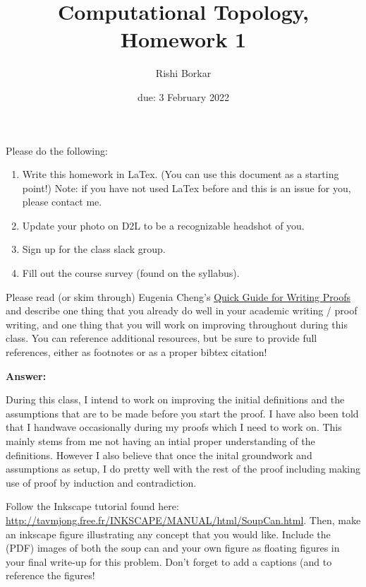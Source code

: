 \documentclass{article}
\title{Computational Topology, Homework 1}
\author{Rishi Borkar}
\date{due: 3 February 2022}
\begin{document}
\maketitle




Please do the following:
\begin{enumerate}
    \item Write this homework in LaTex.  (You can use this document as a
        starting point!)  Note: if you have not used LaTex before and this is an
        issue for you, please contact me.
    \item Update your photo on D2L to be a recognizable headshot of you.
    \item Sign up for the class slack group.
    \item Fill out the course survey (found on the syllabus).
\end{enumerate}

\nextprob{}

Please read (or skim through) Eugenia Cheng’s
\href{http://eugeniacheng.com/wp-content/uploads/2017/02/cheng-proofguide.pdf}{Quick Guide for Writing
Proofs}
and describe one thing
that you already do well in your academic writing / proof writing,
and one thing that you will work on improving
throughout during this class.  You can reference additional resources, but be
sure to provide full references, either as footnotes or as a proper bibtex
citation!

\textbf{Answer:} 

During this class, I intend to work on improving the initial definitions and the assumptions that are to be made before you start the proof. I have also been told that I handwave occasionally during my proofs which I need to work on. This mainly stems from me not having an intial proper understanding of the definitions. 
However I also believe that once the inital groundwork and assumptions as setup, I do pretty well  with the rest of the proof including making use of proof by induction and contradiction.


\nextprob{}

Follow the Inkscape tutorial found here:
\url{http://tavmjong.free.fr/INKSCAPE/MANUAL/html/SoupCan.html}.
Then, make an
inkscape figure illustrating any concept that you would like.
Include the (PDF) images of both the soup can and your own figure as
floating figures in
your final write-up for this problem.  Don't forget to add a captions (and to
reference the figures!
\end{document}
